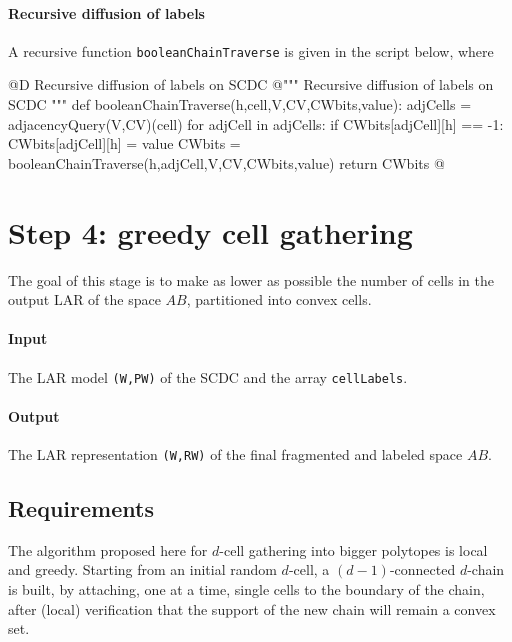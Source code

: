 \documentclass[11pt,oneside]{article}	%
\begin{document}
\paragraph{Recursive diffusion of labels}
A recursive function \texttt{booleanChainTraverse} is given in the script below, where 

@D Recursive diffusion of labels on SCDC
@{""" Recursive diffusion of labels on SCDC """
def booleanChainTraverse(h,cell,V,CV,CWbits,value):
	adjCells = adjacencyQuery(V,CV)(cell)
	for adjCell in adjCells: 
		if CWbits[adjCell][h] == -1:
			CWbits[adjCell][h] = value
			CWbits = booleanChainTraverse(h,adjCell,V,CV,CWbits,value)
	return CWbits
@}



\section{Step 4: greedy cell gathering}

The goal of this stage is to make as lower as possible the number of cells in the  output LAR of the space $AB$, partitioned into convex cells.

\paragraph{Input}
The LAR model \texttt{(W,PW)} of the SCDC and the array \texttt{cellLabels}.

\paragraph{Output}
The LAR representation \texttt{(W,RW)} of the final fragmented and labeled space $AB$.


\subsection{Requirements}

The algorithm proposed here for $d$-cell gathering into bigger polytopes is local and greedy. Starting from an initial random $d$-cell, a $(d-1)$-connected $d$-chain is built, by attaching, one at a time, single cells to the boundary of the chain, after (local) verification that the support of the new chain will remain a convex set. 
\end{document}
